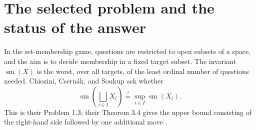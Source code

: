 \documentclass[11pt,letterpaper]{article}
\numberwithin{equation}{section}
\theoremstyle{definition}
\theoremstyle{remark}
\newcommand{\sm}{\operatorname{sm}}
\newcommand{\ceil}[1]{\left\lceil#1\right\rceil}
\newcommand{\bigsqsum}{\bigsqcup}
\begin{document}
\begin{abstract}
We answer negatively Problem 1.3 of Chiozini, Csern\'ak, and Soukup's
\emph{Gamification of the $T_0$-pseudoweight via cut-and-choose games on
topological spaces}, in the version available as arXiv:2510.05754v3.
The counterexample consists of two convergent sequences, so it lies entirely
within compact metrizable ordinal spaces.

The main further result is an exact formula for every nonempty Hausdorff space
of finite Cantor--Bendixson height. If $X^{(h)}\ne\varnothing$ and
$X^{(h+1)}=\varnothing$, then
\[
 \sm(X)=
 \begin{cases}
  \ceil{\log_2(h+1)},& |X^{(h)}|=1,\\
  \ceil{\log_2(h+2)},& |X^{(h)}|\geq2.
 \end{cases}
\]
The proof identifies finite open-query complexity with the logarithm of the
minimum length of an alternating closed-layer decomposition. A canonical
alternating-closure procedure computes that length and retains the orientation
information lost by the scalar invariant $\sm$.

Consequences include sharp one-move failures of the proposed sum identity at
every positive finite level, exact finite-product formulae, a classification on
countable scattered Hausdorff spaces, and a quadratic-time target algorithm for
finite posets. Independent minimax computations verify the finite normal form
on all naturally labelled posets through six elements and all their targets:
320,866 tests in total.
\end{abstract}

\setcounter{tocdepth}{1}
{\small\setlength{\parskip}{0pt}\tableofcontents}
\newpage

\section{The selected problem and the status of the answer}

In the set-membership game, questions are restricted to open subsets of a space,
and the aim is to decide membership in a fixed target subset. The invariant
$\sm(X)$ is the worst, over all targets, of the least ordinal number of questions
needed. Chiozini, Csern\'ak, and Soukup ask whether
\begin{equation}\label{eq:question}
 \sm\!\left(\bigsqsum_{i\in I}X_i\right)
 \stackrel{?}{=}\sup_{i\in I}\sm(X_i).
\end{equation}
This is their Problem 1.3; their Theorem 3.4 gives the upper bound consisting of
the right-hand side followed by one additional move \cite{CCS}.
\end{document}
